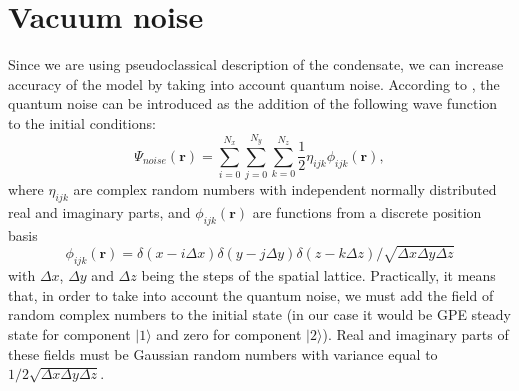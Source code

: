 \documentclass[12pt,notitlepage]{report}
\begin{document}
\section*{Vacuum noise}

Since we are using pseudoclassical description of the condensate, we can increase accuracy of the model by taking into account quantum noise. According to \cite{PhysRevA.58.4824}, the quantum noise can be introduced as the addition of the following wave function to the initial conditions:
\[ \Psi_{noise}(\mathbf{r}) = \sum_{i=0}^{N_x} \sum_{j=0}^{N_y} \sum_{k=0}^{N_z} \frac{1}{2} \eta_{ijk} \phi_{ijk}(\mathbf{r}), \]
where $\eta_{ijk}$ are complex random numbers with independent normally distributed real and imaginary parts, and $\phi_{ijk}(\mathbf{r})$ are functions from a discrete position basis
\[ \phi_{ijk}(\mathbf{r}) = \delta(x - i\Delta x) \delta(y - j\Delta y) \delta(z - k\Delta z) / \sqrt{\Delta x \Delta y \Delta z} \]
with $\Delta x$, $\Delta y$ and $\Delta z$ being the steps of the spatial lattice. Practically, it means that, in order to take into account the quantum noise, we must add the field of random complex numbers to the initial state (in our case it would be GPE steady state for component $\vert1\rangle$ and zero for component $\vert2\rangle$). Real and imaginary parts of these fields must be Gaussian random numbers with variance equal to $1 / 2 \sqrt{\Delta x \Delta y \Delta z}$.



\end{document}

